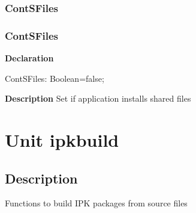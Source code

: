 \documentclass{report}
\newif\ifpdf
\begin{document}
\subsection*{\large{\textbf{ContSFiles}}\normalsize\hspace{1ex}\hrulefill}
\else
\subsection*{ContSFiles}
\fi
\label{igobase-ContSFiles}
\begin{list}{}{
\setlength{\itemindent}{0cm}
\setlength{\listparindent}{0cm}
\setlength{\leftmargin}{\evensidemargin}
\addtolength{\leftmargin}{\tmplength}
\settowidth{\labelsep}{X}
\addtolength{\leftmargin}{\labelsep}
\setlength{\labelwidth}{\tmplength}
}
\item[\textbf{Declaration}\hfill]
\ifpdf
\begin{flushleft}
\fi
\begin{ttfamily}
ContSFiles: Boolean=false;\end{ttfamily}

\ifpdf
\end{flushleft}
\fi

\par
\item[\textbf{Description}]
Set if application installs shared files

\end{list}
\chapter{Unit ipkbuild}
\label{ipkbuild}
\section{Description}
Functions to build IPK packages from source files
\end{document}
